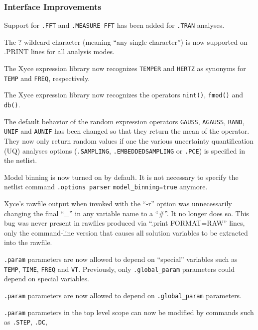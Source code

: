\documentclass[letterpaper]{scrartcl}
\begin{document}
\subsubsection*{Interface Improvements}
\begin{XyceItemize}
  \item Support for \texttt{.FFT} and \texttt{.MEASURE FFT} has been
    added for \texttt{.TRAN} analyses.
  \item The ? wildcard character (meaning ``any single character'') is
    now supported on .PRINT lines for all analysis modes.
  \item The Xyce expression library now recognizes \texttt{TEMPER} and
    \texttt{HERTZ} as synonyms for \texttt{TEMP} and \texttt{FREQ},
    respectively.
  \item The Xyce expression library now recognizes the operators
    \texttt{nint()}, \texttt{fmod()} and \texttt{db()}.
  \item The default behavior of the random expression operators
    \texttt{GAUSS}, \texttt{AGAUSS}, \texttt{RAND}, \texttt{UNIF} and
    \texttt{AUNIF} has been changed so that they return the mean of
    the operator.  They now only return random values if one the
    various uncertainty quantification (UQ) analyses options
    (\texttt{.SAMPLING}, \texttt{.EMBEDDEDSAMPLING} or \texttt{.PCE})
    is specified in the netlist.
  \item Model binning is now turned on by default.  It is not
    necessary to specify the netlist command \texttt{.options parser}
    \texttt{model\_binning=true} anymore.
  \item Xyce's rawfile output when invoked with the ``-r'' option was
    unnecessarily changing the final ``\_'' in any variable name to a
    ``\#''.  It no longer does so.  This bug was never present in
    rawfiles produced via ``.print FORMAT=RAW'' lines, only the
    command-line version that causes all solution variables to be
    extracted into the rawfile.
  \item \texttt{.param} parameters are now allowed to depend on
    ``special'' variables such as \texttt{TEMP}, \texttt{TIME},
    \texttt{FREQ} and \texttt{VT}.  Previously, only
    \texttt{.global\_param} parameters could depend on special
    variables.
  \item \texttt{.param} parameters are now allowed to depend on
    \texttt{.global\_param} parameters.
  \item \texttt{.param} parameters in the top level scope can now be
    modified by commands such as \texttt{.STEP}, \texttt{.DC},

\end{XyceItemize}
\end{document}
